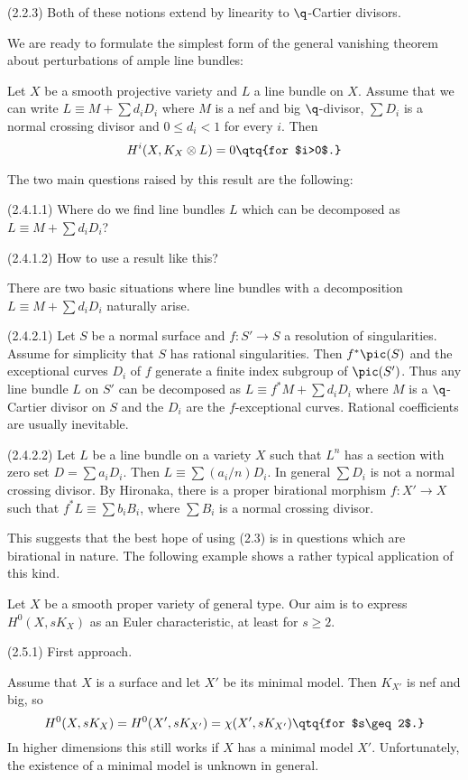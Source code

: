 (2.2.3) Both of these notions extend by linearity to $\q$-Cartier divisors.
\enddemo


We are ready to formulate the simplest form of the general vanishing theorem 
about perturbations of ample line bundles: 


 \cite{Kawamata82; Viehweg82}
Let $X$ be a smooth projective variety and  $L$ 
a line bundle on $X$. Assume that we can write $L\equiv M+\sum d_iD_i$
where $M$ is a nef and big $\q$-divisor, $\sum D_i$ is a normal crossing
divisor and
$0\leq d_i<1$ for every $i$.
 Then
$$
H^i(X,K_X\otimes L)=0\qtq{for $i>0$.}
$$
\endproclaim

 The two main questions raised by this result are the
following:

(2.4.1.1) Where do we find line bundles $L$ which can be decomposed as
$L\equiv M+\sum d_iD_i$?

(2.4.1.2) How to use a result like this?
\enddemo

There are two basic situations where line bundles with a decomposition
$L\equiv M+\sum d_iD_i$ naturally arise.

(2.4.2.1) Let $S$ be a normal surface   and $f:S'\to S$ a resolution of
singularities. Assume for simplicity that $S$ has rational singularities. 
Then $f^*\pic(S)$ and the exceptional curves $D_i$ of
$f$   generate a finite index subgroup of  $\pic(S')$. Thus any
line bundle $L$ on $S'$ can be decomposed as
$L\equiv f^*M+\sum d_iD_i$ where $M$ is a $\q$-Cartier divisor on $S$ and the
$D_i$ are the $f$-exceptional curves. Rational coefficients are usually
inevitable.

(2.4.2.2) Let $L$ be a line bundle on a variety $X$ such that $L^n$ has a
section with zero set $D=\sum a_iD_i$. Then $L\equiv \sum (a_i/n)D_i$.
In general $\sum D_i$ is not a normal crossing divisor. By Hironaka,
there is a proper birational morphism $f:X'\to X$
such that $f^*L\equiv \sum b_iB_i$, where $\sum B_i$ is a normal crossing
divisor. 

This suggests that the best hope of using (2.3) is in questions which are
birational in nature. 
The following example shows a rather typical application of this kind.

Let  $X$ be a smooth proper variety of general type. Our aim is to 
 express $H^0(X,sK_X)$ as an Euler characteristic, at least for $s\geq 2$. 

(2.5.1) First approach. 

Assume that $X$ is a surface and let $X'$ be its
minimal model. Then $K_{X'}$ is nef and big, so
$$
H^0(X,sK_X)=H^0(X',sK_{X'})=\chi(X',sK_{X'})\qtq{for $s\geq 2$.}
$$
In higher dimensions this still works if  $X$ has a minimal model $X'$.
Unfortunately,  the existence of a minimal model is unknown in general.

